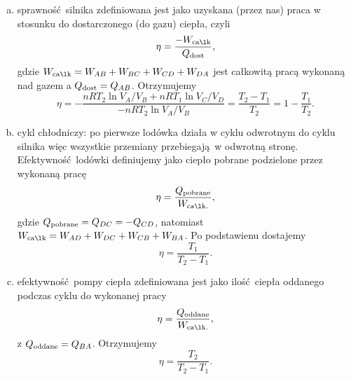 \documentclass[11pt,a4paper]{article}
\begin{document}
\begin{enumerate}[a)]
	\item sprawność silnika zdefiniowana jest jako uzyskana (przez nas) praca w stosunku do dostarczonego (do gazu) ciepła, czyli
	\begin{equation}
		\eta = \frac{-W_{\rm całk}}{Q_{\rm dost}},
	\end{equation}
	gdzie $W_{\rm całk} = W_{AB} + W_{BC} + W_{CD} + W_{DA}$ jest całkowitą pracą wykonaną nad gazem a $Q_{\rm dost} = Q_{AB}$. Otrzymujemy
	\begin{equation}
		\eta = - \frac{n R T_2 \ln V_A / V_B + n R T_1 \ln V_C / V_D}{- n R T_2 \ln V_A / V_B} = \frac{T_2- T_1}{T_2} = 1 - \frac{T_1}{T_2}.
	\end{equation}
	\item cykl chłodniczy: po pierwsze lodówka działa w cyklu odwrotnym do cyklu silnika więc wszystkie przemiany przebiegają w odwrotną stronę. Efektywność lodówki definiujemy jako ciepło pobrane podzielone przez wykonaną pracę
	\begin{equation}
		\eta = \frac{Q_{\rm pobrane}}{W_{\rm całk.}},
	\end{equation}
	gdzie $Q_{\rm pobrane} = Q_{DC} = - Q_{CD}$, natomiast $W_{\rm całk} = W_{AD} + W_{DC} + W_{CB} + W_{BA}$.
	Po podstawienu dostajemy
	\begin{equation}
		\eta = \frac{T_1}{T_2 - T_1}.
	\end{equation} 
	\item efektywność pompy ciepła zdefiniowana jest jako ilość ciepła oddanego podczas cyklu do wykonanej pracy
	\begin{equation}
		\eta  = \frac{Q_{\rm oddane}}{W_{\rm całk.}},
	\end{equation}
	z $Q_{\rm oddane} = Q_{BA}$. Otrzymujemy
	\begin{equation}
		\eta = \frac{T_2}{T_2- T_1}.
	\end{equation}
\end{enumerate}

\newpage
\end{document}
